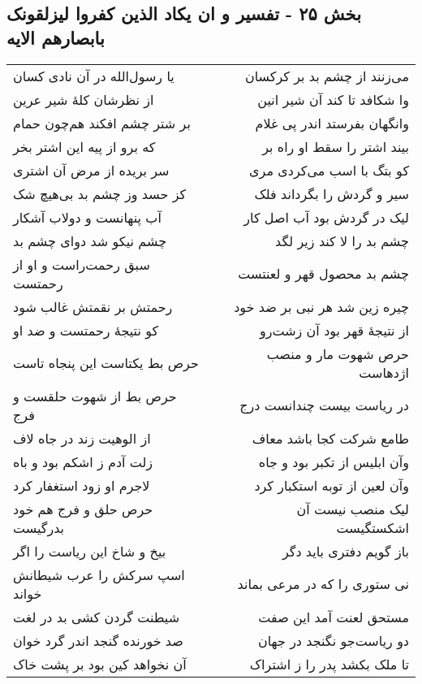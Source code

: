 \begin{center}
\section*{بخش ۲۵ - تفسیر و ان یکاد الذین کفروا لیزلقونک بابصارهم الایه}
\label{sec:sh025}
\begin{longtable}{l p{0.5cm} r}
یا رسول‌الله در آن نادی کسان
&&
می‌زنند از چشم بد بر کرکسان
\\
از نظرشان کلهٔ شیر عرین
&&
وا شکافد تا کند آن شیر انین
\\
بر شتر چشم افکند هم‌چون حمام
&&
وانگهان بفرستد اندر پی غلام
\\
که برو از پیه این اشتر بخر
&&
بیند اشتر را سقط او راه بر
\\
سر بریده از مرض آن اشتری
&&
کو بتگ با اسب می‌کردی مری
\\
کز حسد وز چشم بد بی‌هیچ شک
&&
سیر و گردش را بگرداند فلک
\\
آب پنهانست و دولاب آشکار
&&
لیک در گردش بود آب اصل کار
\\
چشم نیکو شد دوای چشم بد
&&
چشم بد را لا کند زیر لگد
\\
سبق رحمت‌راست و او از رحمتست
&&
چشم بد محصول قهر و لعنتست
\\
رحمتش بر نقمتش غالب شود
&&
چیره زین شد هر نبی بر ضد خود
\\
کو نتیجهٔ رحمتست و ضد او
&&
از نتیجهٔ قهر بود آن زشت‌رو
\\
حرص بط یکتاست این پنجاه تاست
&&
حرص شهوت مار و منصب اژدهاست
\\
حرص بط از شهوت حلقست و فرج
&&
در ریاست بیست چندانست درج
\\
از الوهیت زند در جاه لاف
&&
طامع شرکت کجا باشد معاف
\\
زلت آدم ز اشکم بود و باه
&&
وآن ابلیس از تکبر بود و جاه
\\
لاجرم او زود استغفار کرد
&&
وآن لعین از توبه استکبار کرد
\\
حرص حلق و فرج هم خود بدرگیست
&&
لیک منصب نیست آن اشکستگیست
\\
بیخ و شاخ این ریاست را اگر
&&
باز گویم دفتری باید دگر
\\
اسپ سرکش را عرب شیطانش خواند
&&
نی ستوری را که در مرعی بماند
\\
شیطنت گردن کشی بد در لغت
&&
مستحق لعنت آمد این صفت
\\
صد خورنده گنجد اندر گرد خوان
&&
دو ریاست‌جو نگنجد در جهان
\\
آن نخواهد کین بود بر پشت خاک
&&
تا ملک بکشد پدر را ز اشتراک
\\

\end{longtable}
\end{center}
